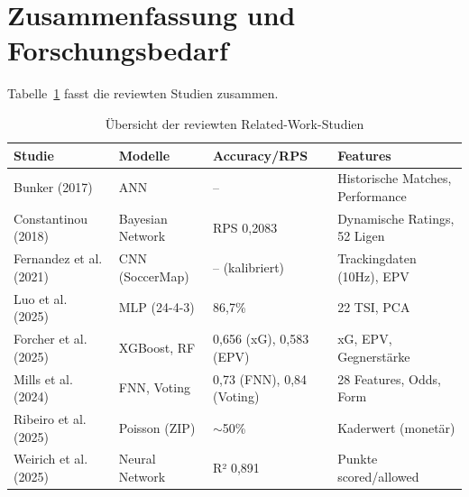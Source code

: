\section{Zusammenfassung und Forschungsbedarf}
\label{sec:zusammenfassung-related-work}

Tabelle~\ref{tab:related-work-uebersicht} fasst die reviewten Studien zusammen.

\begin{table}[h]
    \centering
    \caption{Übersicht der reviewten Related-Work-Studien}
    \label{tab:related-work-uebersicht}
    \begin{tabular}{p{} p{} p{} p{}}
        \toprule
        \textbf{Studie} & \textbf{Modelle} & \textbf{Accuracy/RPS} & \textbf{Features} \\
        \midrule
        Bunker (2017) & ANN & -- & Historische Matches, Performance \\
        Constantinou (2018) & Bayesian Network & RPS 0,2083 & Dynamische Ratings, 52 Ligen \\
        Fernandez et al. (2021) & CNN (SoccerMap) & -- (kalibriert) & Trackingdaten (10Hz), EPV \\
        Luo et al. (2025) & MLP (24-4-3) & 86,7\% & 22 TSI, PCA \\
        Forcher et al. (2025) & XGBoost, RF & 0,656 (xG), 0,583 (EPV) & xG, EPV, Gegnerstärke \\
        Mills et al. (2024) & FNN, Voting & 0,73 (FNN), 0,84 (Voting) & 28 Features, Odds, Form \\
        Ribeiro et al. (2025) & Poisson (ZIP) & $\sim$50\% & Kaderwert (monetär) \\
        Weirich et al. (2025) & Neural Network & R² 0,891 & Punkte scored/allowed \\
        \bottomrule
    \end{tabular}
\end{table}

